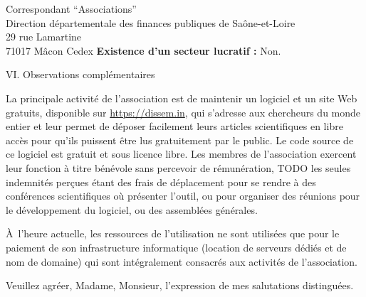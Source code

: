 \documentclass[11pt]{lettre}
\begin{document}
\begin{letter}{Correspondant ``Associations''\\Direction départementale des finances publiques de Saône-et-Loire\\29 rue Lamartine\\71017 Mâcon Cedex}
  \textbf{Existence d'un secteur lucratif :} Non.

  \bigskip
  {\Large VI. Observations complémentaires}

  La principale activité de l'association est de maintenir un logiciel et un
  site Web gratuits, disponible sur \url{https://dissem.in}, qui s'adresse aux chercheurs du monde
  entier et leur permet de déposer facilement leurs articles scientifiques en
  libre accès pour qu'ils puissent être lus gratuitement par le public. Le code
  source de ce logiciel est gratuit et sous licence libre. Les membres
  de l'association exercent leur fonction à titre bénévole sans percevoir de
  rémunération, TODO les seules indemnités perçues étant des frais de déplacement
  pour se rendre à des conférences scientifiques où présenter l'outil, ou pour
  organiser des réunions pour le développement du logiciel, ou des assemblées
  générales.

  À l'heure actuelle, les ressources de l'utilisation ne sont utilisées que pour
  le paiement de son infrastructure informatique (location de serveurs dédiés et
  de nom de domaine) qui sont intégralement consacrés aux activités de
  l'association.

  Veuillez agréer, Madame, Monsieur, l'expression de mes salutations distinguées.

\vspace{2cm}

\hspace{10cm}\begin{minipage}{6cm}
\end{minipage}

\thispagestyle{empty}
\end{letter}
\end{document}
